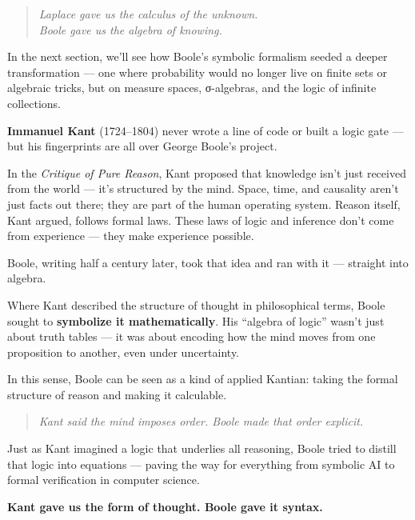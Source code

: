 \begin{quote}
\textit{Laplace gave us the calculus of the unknown. \\
Boole gave us the algebra of knowing.}
\end{quote}

\medskip

In the next section, we’ll see how Boole’s symbolic formalism seeded a deeper transformation — one where probability would no longer live on finite sets or algebraic tricks, but on measure spaces, σ-algebras, and the logic of infinite collections.

\begin{tcolorbox}[colback=gray!5!white, colframe=black!75!white, title={Historical Sidebar: Kant and the Dream of Formal Thought}]

    \textbf{Immanuel Kant} (1724–1804) never wrote a line of code or built a logic gate — but his fingerprints are all over George Boole’s project.
    
    In the \emph{Critique of Pure Reason}, Kant proposed that knowledge isn’t just received from the world — it’s structured by the mind. Space, time, and causality aren’t just facts out there; they are part of the human operating system. Reason itself, Kant argued, follows formal laws. These laws of logic and inference don’t come from experience — they make experience possible.
    
    \medskip
    
    Boole, writing half a century later, took that idea and ran with it — straight into algebra.
    
    Where Kant described the structure of thought in philosophical terms, Boole sought to \textbf{symbolize it mathematically}. His “algebra of logic” wasn’t just about truth tables — it was about encoding how the mind moves from one proposition to another, even under uncertainty.
    
    \medskip
    
    In this sense, Boole can be seen as a kind of applied Kantian: taking the formal structure of reason and making it calculable.
    
    \begin{quote}
    \emph{Kant said the mind imposes order.  
    Boole made that order explicit.}
    \end{quote}
    
    Just as Kant imagined a logic that underlies all reasoning, Boole tried to distill that logic into equations — paving the way for everything from symbolic AI to formal verification in computer science.
    
    \medskip
    
    \textbf{Kant gave us the form of thought. Boole gave it syntax.}

\end{tcolorbox}

